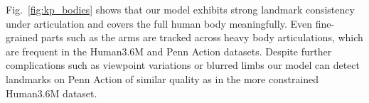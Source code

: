 		Fig.~\ref{fig:kp_bodies} shows that our model exhibits strong landmark consistency under articulation and covers the full human body meaningfully.
		Even fine-grained parts such as the arms are tracked across heavy body articulations, which are frequent in the Human3.6M and Penn Action datasets.
		Despite further complications such as viewpoint variations or blurred limbs our model can detect landmarks on Penn Action of similar quality as in the more constrained Human3.6M dataset.

